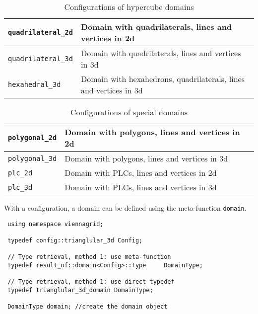 \begin{table}[tb]
  \begin{center}
    \begin{tabular}{|l|l|}
      \hline
      \lstinline|quadrilateral_2d|   &  Domain with quadrilaterals, lines and vertices in 2d  \\
      \hline
      \lstinline|quadrilateral_3d|   &  Domain with quadrilaterals, lines and vertices in 3d  \\
      \hline
      \lstinline|hexahedral_3d|   &  Domain with hexahedrons, quadrilaterals, lines and vertices in 3d  \\
      \hline 
    \end{tabular}
    \caption{Configurations of hypercube domains}
    \label{tab:configs-hypercube}
  \end{center}
\end{table}


\begin{table}[tb]
  \begin{center}
    \begin{tabular}{|l|l|}
      \hline
      \lstinline|polygonal_2d|   &  Domain with polygons, lines and vertices in 2d  \\
      \hline
      \lstinline|polygonal_3d|   &  Domain with polygons, lines and vertices in 3d  \\
      \hline
      \lstinline|plc_2d|   &  Domain with PLCs, lines and vertices in 2d  \\
      \hline 
      \lstinline|plc_3d|   &  Domain with PLCs, lines and vertices in 3d  \\
      \hline 
    \end{tabular}
    \caption{Configurations of special domains}
    \label{tab:configs-special}
  \end{center}
\end{table}

With a configuration, a domain can be defined using the meta-function \lstinline|domain|.

\begin{lstlisting}
 using namespace viennagrid;

 typedef config::trianglular_3d Config;
 
 // Type retrieval, method 1: use meta-function
 typedef result_of::domain<Config>::type     DomainType;
 
 // Type retrieval, method 1: use direct typedef
 typedef trianglular_3d_domain DomainType;

 DomainType domain; //create the domain object
\end{lstlisting}


